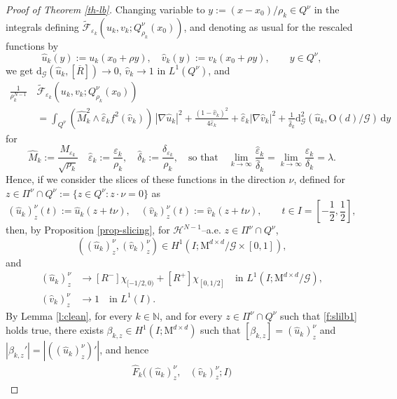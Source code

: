\documentclass[a4paper,reqno]{amsart}
\newcommand\N{\mathbb{N}}
\newcommand{\dG}{\mathrm{d}_{\G}}
\newcommand\calH{\mathcal{H}}
\newcommand\eps{{\varepsilon}}
\theoremstyle{remark}
\def\e{\varepsilon}
\newcommand\dy{{\,\mathrm{d}y}}
\newcommand{\F}{\mathcal{F}}
\newcommand{\G}{\mathcal{G}}
\newcommand{\tF}{\widetilde{\F}}
\newcommand{\On}{\mathrm{O}(d)}
\newcommand{\Mno}{\mathrm{M}^{d\times d}}
\newcommand\uu{{u}}
\numberwithin{equation}{section}
\begin{document}
\begin{proof}[Proof of Theorem \ref{th-lb}]
	Changing variable to $y:=(x-x_0)/\rho_k\in Q^\nu$ in the integrals defining $\tF_{\e_k}  (u_k,v_k;  Q^\nu_{\rho_k}(x_0))$, and denoting as usual for  the rescaled functions  by
	\[
	\widehat\uu_k(y):=\uu_k (x_0+\rho y), \quad \widehat v_k(y):=v_k (x_0+\rho y), \qquad y\in Q^\nu,
	\]
	we get
$ \dG(\widehat u_k,[\overline R])\to0$,
$\widehat v_k\to1$ in $L^1(Q^\nu)$, and
	\[
	\begin{split}
		\frac 1{\rho_k^{N-1}}\, & \tF_{\e_k}  (u_k,v_k;  Q^\nu_{\rho_k}(x_0)) \\ &=
		\int_{Q^\nu} (\widehat M_{k}^2\wedge \widehat\e_k f^2(\widehat v_k))
		\,|\nabla \widehat\uu_k |^2 + \frac{(1-\widehat v_k)^2}{4\widehat \eps_k} +\widehat \eps_k |\nabla \widehat v_k|^2 +
		\frac{1}{\widehat\delta_k} \dG^2(\widehat\uu_k , \On/\G) \dy
	\end{split}
	\]
	for 
	\[
	\widehat M_{k}:= \frac{M_{\e_k}}{\sqrt{\rho_k}}  \quad
	\widehat\eps_k:= \frac{\varepsilon_k}{\rho_k}, \quad  \widehat\delta_k:=\frac{\delta_{\e_k}}{\rho_k}, \quad \text{so that}\quad
	\lim_{k\to \infty} \frac{\widehat\eps_k}{\widehat\delta_k}= \lim_{k\to \infty} \frac{\eps_k}{\delta_k}=\lambda.
	\]
	Hence, if we consider the slices of these functions in the direction $\nu$, defined for   $z \in \Pi^\nu\cap  Q^\nu:=\{z\in Q^\nu \colon z\cdot \nu=0\}$ as
	\[
	(\widehat \uu_k)^\nu_z(t):= \widehat \uu_k(z+t\nu), \quad (\widehat v_k)^\nu_z(t):= \widehat v_k(z+t\nu), 
	\qquad t\in I=\left[-\frac 12, \frac 12 \right],
	\]
	then, by Proposition \ref{prop-slicing}, for $\calH^{N-1}$--a.e. $z\in \Pi^\nu\cap  Q^\nu$,
	\begin{equation}\label{f:slilb1}
		((\widehat \uu_k)^\nu_z, (\widehat v_k)^\nu_z)\in H^1(I;\Mno/\G\times [0,1]),
	\end{equation}
	and
	\begin{equation}\label{f:slilb2}
		\begin{split}
			(\widehat \uu_k)^\nu_z  & \to [R^-] \chi_{[-1/2,0)}+ [R^+] \chi_{[0,1/2]}
			\quad\text{in }L^1(I; \Mno/\G), \\
			(\widehat v_k)^\nu_z &  \to 1 \quad\text{in } L^1(I).
		\end{split}
	\end{equation}
	By Lemma \ref{l:clean}, for every $k\in\N$, and for every $z\in \Pi^\nu\cap  Q^\nu$ such that \eqref{f:slilb1} holds true,
	there exists $\beta_{k,z}\in H^1(I;\Mno)$ such that $[\beta_{k,z}]=(\widehat \uu_k)^\nu_z $ and 
	$|\beta_{k,z}'|=|((\widehat \uu_k)^\nu_z)'|$, and hence 
	\[
	\begin{split}
		\widehat F_k((\widehat \uu_k)^\nu_z, & (\widehat v_k)^\nu_z;I)

\end{split}\]
\end{proof}
\end{document}
